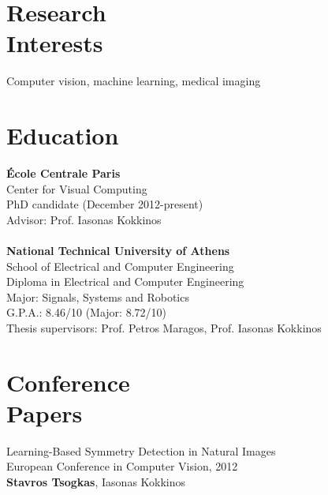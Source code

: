 \documentclass[margin]{res}
\begin{document}
 
 
 
\address{\'Ecole Centrale Paris\\Grande Voie des Vignes\\ 92295 Ch\^atenay-Malabry, France \\ }
\address{Email: stavros.tsogkas[at]ecp.fr \\ \url{http://cvc.centrale-ponts.fr/personnel/tsogkas}}
 
\begin{resume} 
 
\section{Research\\Interests} 
Computer vision, machine learning, medical imaging
\\

\section{Education} 
\textbf{\'Ecole Centrale Paris}\\
Center for Visual Computing\\
PhD candidate (December 2012-present) \\
Advisor: Prof. Iasonas Kokkinos
\\
\\
\textbf{National Technical University of Athens}\\
School of Electrical and Computer Engineering\\
Diploma in Electrical and Computer Engineering\\
Major: Signals, Systems and Robotics\\
G.P.A.: 8.46/10 (Major: 8.72/10)\\
Thesis supervisors: Prof. Petros Maragos, Prof. Iasonas Kokkinos

\section{Conference\\Papers}
Learning-Based Symmetry Detection in Natural Images\\
European Conference in Computer Vision, 2012\\
\textbf{Stavros Tsogkas}, Iasonas Kokkinos


\end{resume}
\end{document}
